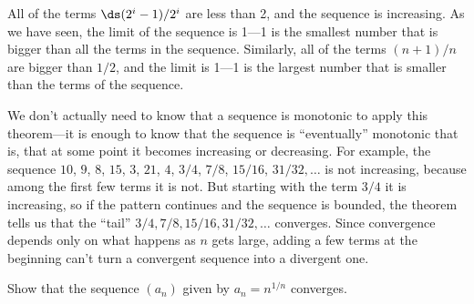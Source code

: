 \begin{example}
All of the terms $\ds (2^i-1)/2^i$ are less than 2, and the sequence is
increasing. As we have seen, the limit of the sequence is 1---1 is the
smallest number that is bigger than all the terms in the sequence.
Similarly, all of the terms $(n+1)/n$ are bigger than $1/2$, and the
limit is 1---1 is the largest number that is smaller than the terms of
the sequence.
\end{example}

We don't actually need to know that a sequence is monotonic to apply
this theorem---it is enough to know that the sequence is
``eventually'' monotonic
that is, that at some point it becomes increasing or decreasing.  For
example, the sequence $10$, $9$, $8$, $15$, $3$, $21$, $4$, $3/4$,
$7/8$, $15/16$, $31/32,\ldots$ is not increasing, because among the
first few terms it is not. But starting with the term $3/4$ it is
increasing, so if the pattern continues and the sequence is bounded,
the theorem tells us that the ``tail'' $3/4, 7/8, 15/16, 31/32,\ldots$
converges.  Since convergence depends only on what happens as $n$ gets
large, adding a few terms at the beginning can't turn a convergent
sequence into a divergent one.

\begin{example}
\label{example:nth-root-of-n}
Show that the sequence $(a_n)$ given by $a_n = n^{1/n}$ converges.
\end{example}

